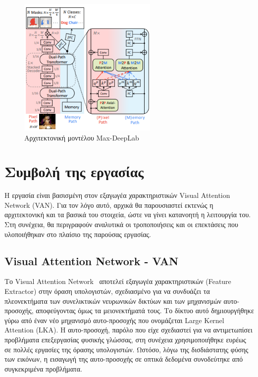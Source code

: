 \documentclass[12pt]{article}
\numberwithin{equation}{section}
\begin{document}
\begin{figure}[H]
  \centering
  \includegraphics[width=0.6\textwidth]{images/MaxDeepLab.png} %
  \caption{Αρχιτεκτονική μοντέλου Max-DeepLab}
  \label{figure 20}
\end{figure} 

\clearpage    
\newpage

\section{Συμβολή της εργασίας}

Η εργασία είναι βασισμένη στον εξαγωγέα χαρακτηριστικών Visual Attention Network (VAN). Για τον λόγο αυτό, αρχικά θα παρουσιαστεί εκτενώς η αρχιτεκτονική και τα βασικά του στοιχεία, ώστε να γίνει κατανοητή η λειτουργία του. Στη συνέχεια, θα περιγραφούν αναλυτικά οι τροποποιήσεις και οι επεκτάσεις που υλοποιήθηκαν στο πλαίσιο της παρούσας εργασίας.\\

\subsection{Visual Attention Network - VAN}

Το Visual Attention Network~\cite{guo2022visualattentionnetwork} αποτελεί εξαγωγέα χαρακτηριστικών (Feature Extractor) στην όραση υπολογιστών, σχεδιασμένο για να συνδυάζει τα πλεονεκτήματα των συνελικτικών νευρωνικών δικτύων και των μηχανισμών αυτο-προσοχής, αποφεύγοντας όμως τα μειονεκτήματά τους. Το δίκτυο αυτό δημιουργήθηκε γύρω από έναν νέο μηχανισμό αυτο-προσοχής που ονομάζεται Large Kernel Attention (LKA). Η αυτο-προσοχή, παρόλο που είχε σχεδιαστεί για να αντιμετωπίσει προβλήματα επεξεργασίας φυσικής γλώσσας, στη συνέχεια χρησιμοποιήθηκε ευρέως σε πολλές εργασίες της όρασης υπολογιστών. Ωστόσο, λόγω της δισδιάστατης φύσης των εικόνων, η εισαγωγή της αυτο-προσοχής σε οπτικά δεδομένα συνοδεύτηκε από συγκεκριμένα προβλήματα.\\
\end{document}
